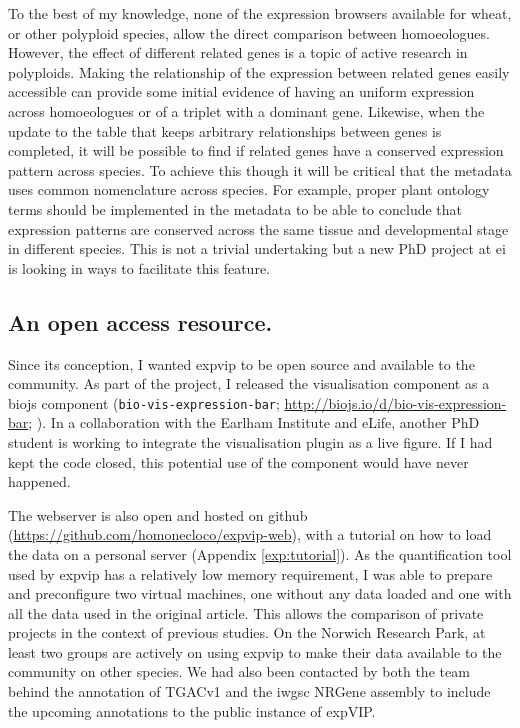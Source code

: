 To the best of my knowledge, none of the expression browsers available for wheat, or other polyploid species, allow the direct comparison between homoeologues. However, the effect of different related genes is a topic of active research in polyploids. 
Making the relationship of the expression between related genes easily accessible can provide some initial evidence of having an uniform expression across homoeologues or of a triplet with a dominant gene. 
Likewise, when the update to the table that keeps arbitrary relationships between genes is completed, it will be possible to find if related genes have a conserved expression pattern across species. 
To achieve this though it will be critical that the metadata uses common nomenclature across species. 
For example, proper plant ontology \citep{Cooper2013} terms should be implemented in the metadata to be able to conclude that expression patterns are conserved across the same tissue and developmental stage in different species. 
This is not a trivial undertaking but a new PhD project at \gls{ei} is looking in ways to facilitate this feature. 

\subsection{An open access resource.}
Since its conception, I wanted \gls{expvip} to be open source and available to the community. 
As part of the project, I released the visualisation component as a biojs component  (\texttt{bio-vis-expression-bar}; \url{http://biojs.io/d/bio-vis-expression-bar}; \citealt{Yachdav2015}).
In a collaboration with the Earlham Institute and eLife, another PhD student is working to integrate the visualisation plugin as a live figure. 
If I had kept the code closed, this potential use of the component would have never happened. 

The webserver is also open and hosted on github (\url{https://github.com/homonecloco/expvip-web}), with a tutorial on how to load the data on a personal server (Appendix \ref{exp:tutorial}). 
As the quantification tool used by \gls{expvip} has a relatively low memory requirement, I was able to prepare and preconfigure two virtual machines, one without any data loaded and one with all the data used in the original article.%
This allows the comparison of private projects in the context of previous studies. 
On the Norwich Research Park, at least two groups are actively on using \gls{expvip} to make their data available to the community on other species.
We had also been contacted by both the team behind the annotation of TGACv1 and the \gls{iwgsc} NRGene assembly to include the upcoming annotations to the public instance of expVIP. 

